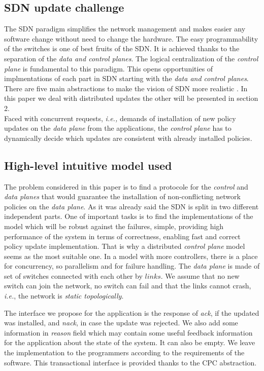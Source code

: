 \documentclass{article}
\theoremstyle{remark}
\begin{document}
\subsection{ SDN update challenge}
The SDN paradigm simplifies the network management and makes easier any software change without need to change the hardware. The easy programmability of the switches is one of best fruits of the SDN. It is achieved thanks to the separation of the \emph{data and control planes}. The logical centralization of the \emph{control plane} is fundamental to this paradigm. 
This opens opportunities of implmentations of each part in SDN starting with the \emph{data and control planes}.
There are five main abstractions to make the vision of SDN more realistic\cite{Casado:2014:ASN:2661061.2661063} . In this paper we deal with distributed updates the other will be presented in section 2.\\ 
Faced with concurrent requests, \emph{i.e.,} demands of installation of new policy updates on the \emph{data plane}  from the applications, the \emph{control plane} has to dynamically decide which updates are consistent with already installed policies.
\subsection{High-level intuitive model used}
The problem considered in this paper is to find a protocole for the \emph{control} and \emph{data planes} that would guarantee the installation of non-conflicting network policies on the \emph{data plane}. 
As it was already said the SDN is split in two different independent parts. One of important tasks is to find the implementations of the model which will be robust against the failures, simple, providing high performance of the system in terms of correctness, enabling fast and correct policy update implementation.
That is why a distributed \emph{control plane} model seems as the most suitable one. In a model with more controllers, there is a place for concurrency, so parallelism and for failure handling. 
The \emph{data plane} is made of set of switches connected with each other by $links$. We assume that no new switch can join the network, no switch can fail and that the links cannot crash, \emph{i.e.}, the network is \emph{static topologically}. 
  
The interface we propose for the application is the response of \emph{ack}, if the updated was installed, and \emph{nack}, in case the update was rejected. We also add some information in \emph{reason} field which may contain some useful feedback information for the application about the state of the system. It can also be empty. We leave the implementation to the programmers according to the requirements of the software. This transactional interface is provided thanks to the CPC abstraction.
\end{document}
